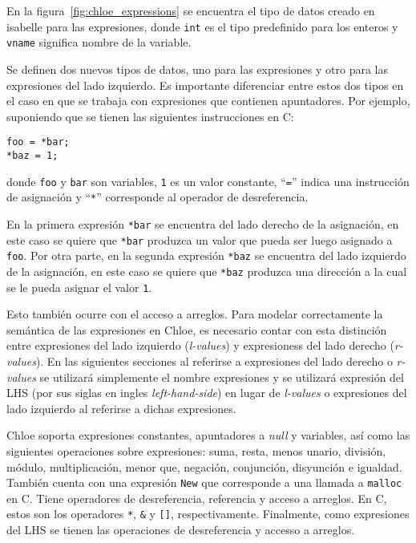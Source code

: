 En la figura~\ref{fig:chloe_expressions} se encuentra el tipo de datos creado en isabelle para las expresiones, donde \verb|int| es el tipo predefinido para los enteros y \verb|vname| significa nombre de la variable.

Se definen dos nuevos tipos de datos, uno para las expresiones y otro para las expresiones del lado izquierdo.
Es importante diferenciar entre estos dos tipos en el caso en que se trabaja con expresiones que contienen apuntadores.
Por ejemplo, suponiendo que se tienen las siguientes instrucciones en C:

\begin{lstlisting}[mathescape=true, frame=single]
foo = *bar;
*baz = 1;
\end{lstlisting}

donde \verb|foo| y \verb|bar| son variables, \verb|1| es un valor constante, ``\verb|=|'' indica una instrucción de asignación y ``\verb|*|'' corresponde al operador de desreferencia.

En la primera expresión \verb|*bar| se encuentra del lado derecho de la asignación, en este caso se quiere que \verb|*bar| produzca un valor que pueda ser luego asignado a \verb|foo|.
Por otra parte, en la segunda expresión \verb|*baz| se encuentra del lado izquierdo de la asignación, en este caso se quiere que \verb|*baz| produzca una dirección a la cual se le pueda asignar el valor \verb|1|.

Esto también ocurre con el acceso a arreglos.
Para modelar correctamente la semántica de las expresiones en Chloe, es necesario contar con esta distinción entre expresiones del lado izquierdo (\textit{l-values}) y expresioness del lado derecho (\textit{r-values}).
En las siguientes secciones al referirse a expresiones del lado derecho o \textit{r-values} se utilizará simplemente el nombre expresiones y se utilizará expresión del LHS (por sus siglas en ingles \textit{left-hand-side}) en lugar de \textit{l-values} o expresiones del lado izquierdo al referirse a dichas expresiones.
\begin{comment}
FIXME mosca! esto está mal traducido!
\end{comment}

Chloe soporta expresiones constantes, apuntadores a \textit{null} y variables, así como las siguientes operaciones sobre expresiones: suma, resta, menos unario, división, módulo, multiplicación, menor que, negación, conjunción, disyunción e igualdad.
También cuenta con una expresión \verb|New| que corresponde a una llamada a \verb|malloc| en C.
Tiene operadores de desreferencia, referencia y acceso a arreglos.
En C, estos son los operadores \verb|*|, \verb|&| y \verb|[]|, respectivamente.
Finalmente, como expresiones del LHS se tienen las operaciones de desreferencia y accesso a arreglos.
\begin{comment}
FIXME mosca! esto está mal traducido!
\end{comment}

